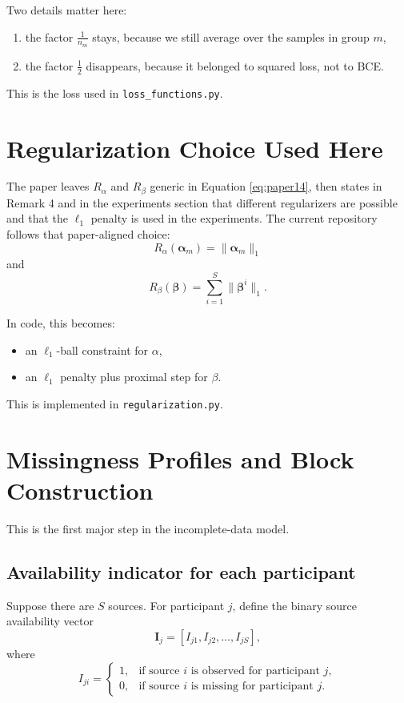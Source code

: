\documentclass[11pt]{article}
\newcommand{\alpham}{\boldsymbol{\alpha}_m}
\newcommand{\betai}{\boldsymbol{\beta}^i}
\newcommand{\betavec}{\boldsymbol{\beta}}
\begin{document}
Two details matter here:
\begin{enumerate}
  \item the factor $\frac{1}{n_m}$ stays, because we still average over the
  samples in group $m$,
  \item the factor $\frac{1}{2}$ disappears, because it belonged to squared
  loss, not to BCE.
\end{enumerate}

This is the loss used in \texttt{loss\_functions.py}.

\section{Regularization Choice Used Here}

The paper leaves $R_{\alpha}$ and $R_{\beta}$ generic in Equation
\eqref{eq:paper14}, then states in Remark 4 and in the experiments section that
different regularizers are possible and that the $\ell_1$ penalty is used in
the experiments. The current repository follows that paper-aligned choice:
\begin{equation}
\label{eq:ralpha-choice}
R_{\alpha}(\alpham) = \|\alpham\|_1
\end{equation}
and
\begin{equation}
\label{eq:rbeta-choice}
R_{\beta}(\betavec)
=
\sum_{i=1}^{S} \|\betai\|_1.
\end{equation}

In code, this becomes:
\begin{itemize}
  \item an $\ell_1$-ball constraint for $\alpha$,
  \item an $\ell_1$ penalty plus proximal step for $\beta$.
\end{itemize}

This is implemented in \texttt{regularization.py}.

\section{Missingness Profiles and Block Construction}

This is the first major step in the incomplete-data model.

\subsection{Availability indicator for each participant}

Suppose there are $S$ sources. For participant $j$, define the binary source
availability vector
\begin{equation}
\label{eq:availability-vector}
\mathbf{I}_j = [I_{j1}, I_{j2}, \dots, I_{jS}],
\end{equation}
where
\begin{equation}
\label{eq:availability-entry}
I_{ji} =
\begin{cases}
1, & \text{if source } i \text{ is observed for participant } j, \\
0, & \text{if source } i \text{ is missing for participant } j.
\end{cases}
\end{equation}
\end{document}
